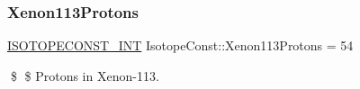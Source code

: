\subsubsection{\texorpdfstring{Xenon113\+Protons}{Xenon113Protons}}
{\footnotesize\ttfamily \mbox{\hyperlink{group___isotope_const-_macros_ga5f18360b3e99483a35c32d789e62621c}{I\+S\+O\+T\+O\+P\+E\+C\+O\+N\+S\+T\+\_\+\+I\+NT}} Isotope\+Const\+::\+Xenon113\+Protons = 54}

\$ \$ Protons in Xenon-\/113. 